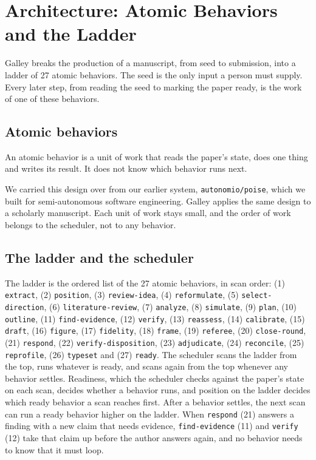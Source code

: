 \documentclass[
]{article}
\begin{document}
\section{Architecture: Atomic Behaviors and the
Ladder}\label{architecture-atomic-behaviors-and-the-ladder}

Galley breaks the production of a manuscript, from seed to submission,
into a ladder of 27 atomic behaviors. The seed is the only input a
person must supply. Every later step, from reading the seed to marking
the paper ready, is the work of one of these behaviors.

\subsection{Atomic behaviors}\label{atomic-behaviors}

An atomic behavior is a unit of work that reads the paper's state, does
one thing and writes its result. It does not know which behavior runs
next.

We carried this design over from our earlier system,
\texttt{autonomio/poise}, which we built for semi-autonomous software
engineering. Galley applies the same design to a scholarly manuscript.
Each unit of work stays small, and the order of work belongs to the
scheduler, not to any behavior.

\subsection{The ladder and the
scheduler}\label{the-ladder-and-the-scheduler}

The ladder is the ordered list of the 27 atomic behaviors, in scan
order: (1) \texttt{extract}, (2) \texttt{position}, (3)
\texttt{review-idea}, (4) \texttt{reformulate}, (5)
\texttt{select-direction}, (6) \texttt{literature-review}, (7)
\texttt{analyze}, (8) \texttt{simulate}, (9) \texttt{plan}, (10)
\texttt{outline}, (11) \texttt{find-evidence}, (12) \texttt{verify},
(13) \texttt{reassess}, (14) \texttt{calibrate}, (15) \texttt{draft},
(16) \texttt{figure}, (17) \texttt{fidelity}, (18) \texttt{frame}, (19)
\texttt{referee}, (20) \texttt{close-round}, (21) \texttt{respond}, (22)
\texttt{verify-disposition}, (23) \texttt{adjudicate}, (24)
\texttt{reconcile}, (25) \texttt{reprofile}, (26) \texttt{typeset} and
(27) \texttt{ready}. The scheduler scans the ladder from the top, runs
whatever is ready, and scans again from the top whenever any behavior
settles. Readiness, which the scheduler checks against the paper's state
on each scan, decides whether a behavior runs, and position on the
ladder decides which ready behavior a scan reaches first. After a
behavior settles, the next scan can run a ready behavior higher on the
ladder. When \texttt{respond} (21) answers a finding with a new claim
that needs evidence, \texttt{find-evidence} (11) and \texttt{verify}
(12) take that claim up before the author answers again, and no behavior
needs to know that it must loop.
\end{document}
